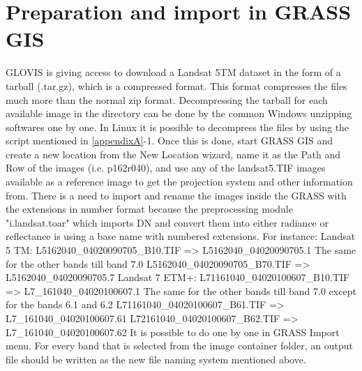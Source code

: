 \section{Preparation and import in GRASS GIS}
GLOVIS is giving access to download a Landsat 5TM dataset in the form of a tarball (.tar.gz), which is a compressed format. This format compresses the files much more than the normal zip format. Decompressing the tarball for each available image in the directory can be done by the common Windows unzipping softwares one by one.\newline\linebreak
In Linux it is possible to decompress the files by using the script mentioned in \ref{appendixA}-1.\newline
Once this is done, start GRASS GIS and create a new location from the New Location wizard, name it as the Path and Row of the images (i.e. p162r040), and use any of the landsat5.TIF images available as a reference image to get the projection system and other information from.\newline
There is a need to import and rename the images inside the GRASS with the extensions in number format because the preprocessing module "i.landsat.toar" which imports DN and convert them into either radiance or reflectance is using a base name with numbered extensions.  For instance:\newline\linebreak
Landsat 5 TM:\newline
L5162040\_04020090705\_B10.TIF => L5162040\_04020090705.1\newline
The same for the other bands till band 7.0\newline
L5162040\_04020090705\_B70.TIF => L5162040\_04020090705.7\newline\linebreak
Landsat 7 ETM+:\newline
L71161040\_04020100607\_B10.TIF => L7\_161040\_04020100607.1\newline
The same for the other bands till band 7.0 except for the bands 6.1 and 6.2\newline
L71161040\_04020100607\_B61.TIF => L7\_161040\_04020100607.61\newline
L72161040\_04020100607\_B62.TIF => L7\_161040\_04020100607.62\newline\linebreak
It is possible to do one by one in GRASS Import menu. For every band that is selected from the image container folder, an output file should be written as the new file naming system mentioned above.\newline

